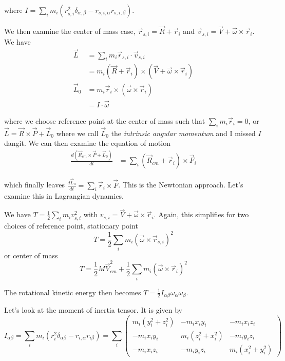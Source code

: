 \documentclass[10pt]{report}
\newcommand{\rd}[2]{\frac{d#1}{d#2}}
\begin{document}
where $I = \sum_i m_i \left( r_{s,i}^2 \delta_{\alpha,\beta} - r_{s,i,\alpha}r_{s,i,\beta} \right)$. 

We then examine the center of mass case, $\vec{r}_{s,i} = \vec{R} + \vec{r}_i$ and $\vec{v}_{s,i} = \vec{V} + \vec{\omega} \times \vec{r}_i$. We have \begin{align*}
    \vec{L} &= \sum_i m_i \vec{r}_{s,i} \cdot \vec{v}_{s,i} \\
    &= m_i\left( \vec{R} + \vec{r}_i \right) \times \left( \vec{V} + \vec{\omega}\times \vec{r}_i \right)\\
    \vec{L}_0 &= m_i \vec{r}_i \times \left( \vec{\omega}\times \vec{r}_i \right)\\
    &= I \cdot \vec{\omega}
\end{align*}

where we choose reference point at the center of mass such that $\sum_i m_i \vec{r}_i = 0$, or $\vec{L} = \vec{R}\times \vec{P} + \vec{L}_0$ where we call $\vec{L}_0$ the \emph{intrinsic angular momentum} and I missed $I$ dangit. We can then examine the equation of motion
\begin{align*}
    \rd{\left( \vec{R}_{cm} \times \vec{P} + \vec{L}_0 \right)}{t} &= \sum_i \left( \vec{R}_{cm} + \vec{r}_i \right)\times \vec{F}_i
\end{align*}

which finally leaves $\rd{\vec{L}_0}{t} = \sum_i \vec{r}_i \times \vec{F}$. This is the Newtonian approach. Let's examine this in Lagrangian dynamics.

We have $T = \frac{1}{2}\sum_i m_i v_{s,i}^2$ with $v_{s,i} = \vec{V} + \vec{\omega}\times \vec{r}_i$. Again, this simplifies for two choices of reference point, stationary point 
$$T = \frac{1}{2}\sum_i m_i\left( \vec{\omega} \times \vec{r}_{s,i} \right)^2$$
or center of mass
$$T = \frac{1}{2}M\vec{V}_{cm}^2 + \frac{1}{2}\sum_i m_i\left( \vec{\omega}\times \vec{r}_i \right)^2$$

The rotational kinetic energy then becomes $T = \frac{1}{2}I_{\alpha\beta}\omega_\alpha \omega_\beta$. 

Let's look at the moment of inertia tensor. It is given by
$$I_{\alpha\beta} = \sum_i m_i \left( r_i^2\delta_{\alpha\beta} - r_{i,\alpha}r_{i\beta} \right) = \sum_i\begin{pmatrix}
     m_i\left( y_i^2 + z_i^2 \right)& - m_i x_i y_i & -m_i x_i z_i\\
    -m_i x_i y_i & m_i \left( z_i^2 + x_i^2 \right) & -m_i y_i z_i\\
    -m_i x_i z_i & -m_i y_i z_i & m_i\left( x_i^2 + y_i^2 \right)
\end{pmatrix}$$
\end{document}
